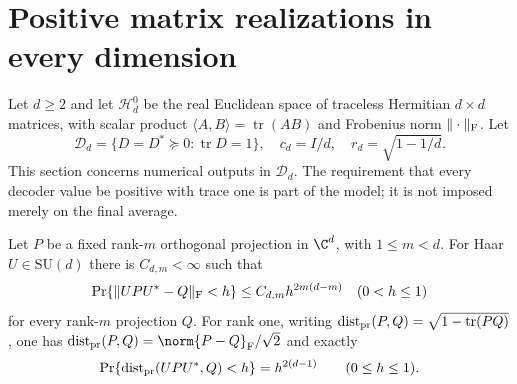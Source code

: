 \section{Positive matrix realizations in every dimension}\label{sec:matrix57}
Let $d\ge2$ and let $\mathcal H_d^0$ be the real Euclidean space of traceless Hermitian $d\times d$ matrices, with scalar product $\langle A,B\rangle=\operatorname{tr}(AB)$ and Frobenius norm $\|\cdot\|_{\rm F}$. Let
\[
 \mathcal D_d=\{D=D^*\succeq0:\operatorname{tr}D=1\},\quad
 c_d=I/d,\quad r_d=\sqrt{1-1/d}.
\]
This section concerns numerical outputs in $\mathcal D_d$. The requirement that every decoder value be positive with trace one is part of the model; it is not imposed merely on the final average.

\begin{lemma}\label{lem:grassmann57}
Let $P$ be a fixed rank-$m$ orthogonal projection in $\C^d$, with $1\le m<d$. For Haar $U\in\mathrm{SU}(d)$ there is $C_{d,m}<\infty$ such that
\[
 \Pr\{\|UPU^*-Q\|_{\rm F}<h\}\le C_{d,m}h^{2m(d-m)}\quad(0<h\le1)
\]
for every rank-$m$ projection $Q$. For rank one, writing
$\operatorname{dist}_{\rm pr}(P,Q)=\sqrt{1-\operatorname{tr}(PQ)}$, one has $\operatorname{dist}_{\rm pr}(P,Q)=\norm{P-Q}_{\rm F}/\sqrt2$ and exactly
\begin{equation}\label{eq:projectivecap57}
 \Pr\{\operatorname{dist}_{\rm pr}(UPU^*,Q)<h\}=h^{2(d-1)}
                         \qquad(0\le h\le1).
\end{equation}
\end{lemma}
